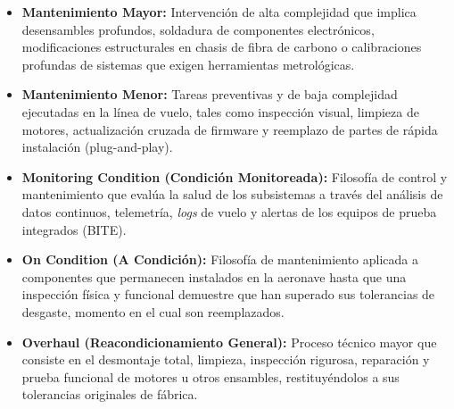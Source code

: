 \begin{itemize}
    \item \textbf{Mantenimiento Mayor:} Intervención de alta complejidad que implica desensambles profundos, soldadura de componentes electrónicos, modificaciones estructurales en chasis de fibra de carbono o calibraciones profundas de sistemas que exigen herramientas metrológicas.
    
    \item \textbf{Mantenimiento Menor:} Tareas preventivas y de baja complejidad ejecutadas en la línea de vuelo, tales como inspección visual, limpieza de motores, actualización cruzada de firmware y reemplazo de partes de rápida instalación (plug-and-play).
    
    \item \textbf{Monitoring Condition (Condición Monitoreada):} Filosofía de control y mantenimiento que evalúa la salud de los subsistemas a través del análisis de datos continuos, telemetría, \textit{logs} de vuelo y alertas de los equipos de prueba integrados (BITE).
    
    \item \textbf{On Condition (A Condición):} Filosofía de mantenimiento aplicada a componentes que permanecen instalados en la aeronave hasta que una inspección física y funcional demuestre que han superado sus tolerancias de desgaste, momento en el cual son reemplazados.
    
    \item \textbf{Overhaul (Reacondicionamiento General):} Proceso técnico mayor que consiste en el desmontaje total, limpieza, inspección rigurosa, reparación y prueba funcional de motores u otros ensambles, restituyéndolos a sus tolerancias originales de fábrica.
\end{itemize}